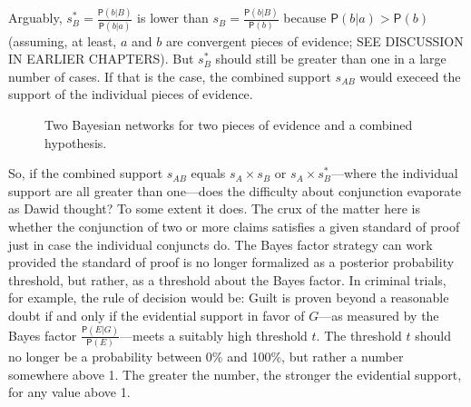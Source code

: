 \documentclass[10pt,dvipsnames,enabledeprecatedfontcommands]{scrartcl}
\newcommand{\pr}[1]{\mathsf{P}(#1)}
\begin{document}
\noindent  Arguably, \(s^{*}_{B}= \frac{\pr{b |B}}{\pr{b|a}}\) is lower
than \(s_{B}= \frac{\pr{b |B}}{\pr{b}}\) because \(\pr{b | a} > \pr{b}\)
(assuming, at least, \(a\) and \(b\) are convergent pieces of evidence;
SEE DISCUSSION IN EARLIER CHAPTERS). But \(s^{*}_{B}\) should still be
greater than one in a large number of cases. If that is the case, the
combined support \(s_{AB}\) would execeed the support of the individual
pieces of evidence.

\begin{center}
\begin{figure}[h!]

\caption{Two Bayesian networks for two pieces of evidence and a combined hypothesis.}
\label{network-conjunction}
\end{figure}
\end{center}

So, if the combined support \(s_{AB}\) equals \(s_{A}\times s_{B}\) or
\(s_{A}\times s^{*}_{B}\)---where the individual support are all greater
than one---does the difficulty about conjunction evaporate as Dawid
thought? To some extent it does. The crux of the matter here is whether
the conjunction of two or more claims satisfies a given standard of
proof just in case the individual conjuncts do. The Bayes factor
strategy can work provided the standard of proof is no longer formalized
as a posterior probability threshold, but rather, as a threshold about
the Bayes factor. In criminal trials, for example, the rule of decision
would be: Guilt is proven beyond a reasonable doubt if and only if the
evidential support in favor of \(G\)---as measured by the Bayes factor
\(\frac{\pr{E | G}}{\pr{E}}\)---meets a suitably high threshold \(t\).
The threshold \(t\) should no longer be a probability between 0\% and
100\%, but rather a number somewhere above 1. The greater the number,
the stronger the evidential support, for any value above 1.\\
\end{document}
